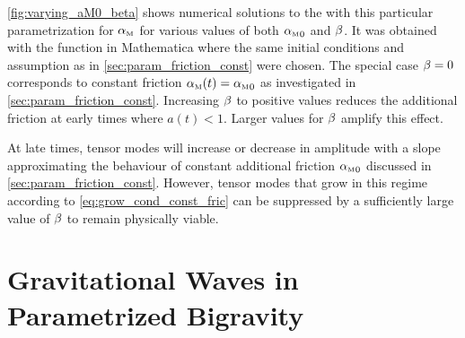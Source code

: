 \documentclass[12pt,parskip=half]{scrreprt}
\begin{document}
\autoref{fig:varying_aM0_beta} shows numerical solutions to the  with this particular parametrization for \({\alpha_{\textnormal{\tiny{M}}}}\) for various values of both \({\alpha_{\textnormal{\tiny{M}}}}_0\) and \(\beta\). It was obtained with the  function in Mathematica where the same initial conditions and assumption as in \autoref{sec:param_friction_const} were chosen. The special case \(\beta=0\) corresponds to constant friction \({\alpha_{\textnormal{\tiny{M}}}}(t)={\alpha_{\textnormal{\tiny{M}}}}_0\) as investigated in \autoref{sec:param_friction_const}. Increasing \(\beta\) to positive values reduces the additional friction at early times where \(a(t) < 1\). Larger values for \(\beta\) amplify this effect. 


At late times, tensor modes will increase or decrease in amplitude with a slope approximating the behaviour of constant additional friction \({\alpha_{\textnormal{\tiny{M}}}}_0\) discussed in \autoref{sec:param_friction_const}. However, tensor modes that grow in this regime according to \eqref{eq:grow_cond_const_fric} can be suppressed by a sufficiently large value of \(\beta\) to remain physically viable. 



\chapter{Gravitational Waves in Parametrized Bigravity}\label{ch:param_bigravity}
\end{document}
